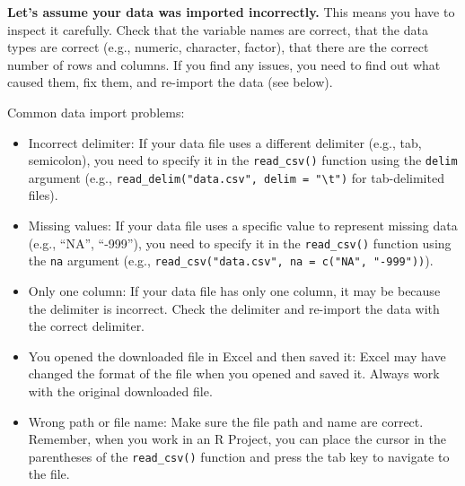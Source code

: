 \documentclass[
  letterpaper,
  8pt,
  a4paper]{book}
\providecommand{\tightlist}{%
  \setlength{\itemsep}{0pt}\setlength{\parskip}{0pt}}
\begin{document}
\begin{tcolorbox}[enhanced jigsaw, arc=.35mm, bottomrule=.15mm, bottomtitle=1mm, breakable, colback=white, colbacktitle=quarto-callout-important-color!10!white, colframe=quarto-callout-important-color-frame, coltitle=black, left=2mm, leftrule=.75mm, opacityback=0, opacitybacktitle=0.6, rightrule=.15mm, title=\textcolor{quarto-callout-important-color}{\faExclamation}\hspace{0.5em}{Important}, titlerule=0mm, toprule=.15mm, toptitle=1mm]

\textbf{Let's assume your data was imported incorrectly.} This means you
have to inspect it carefully. Check that the variable names are correct,
that the data types are correct (e.g., numeric, character, factor), that
there are the correct number of rows and columns. If you find any
issues, you need to find out what caused them, fix them, and re-import
the data (see below).

\end{tcolorbox}

Common data import problems:

\begin{itemize}
\tightlist
\item
  Incorrect delimiter: If your data file uses a different delimiter
  (e.g., tab, semicolon), you need to specify it in the
  \texttt{read\_csv()} function using the \texttt{delim} argument (e.g.,
  \texttt{read\_delim("data.csv",\ delim\ =\ "\textbackslash{}t")} for
  tab-delimited files).
\item
  Missing values: If your data file uses a specific value to represent
  missing data (e.g., ``NA'', ``-999''), you need to specify it in the
  \texttt{read\_csv()} function using the \texttt{na} argument (e.g.,
  \texttt{read\_csv("data.csv",\ na\ =\ c("NA",\ "-999"))}).
\item
  Only one column: If your data file has only one column, it may be
  because the delimiter is incorrect. Check the delimiter and re-import
  the data with the correct delimiter.
\item
  You opened the downloaded file in Excel and then saved it: Excel may
  have changed the format of the file when you opened and saved it.
  Always work with the original downloaded file.
\item
  Wrong path or file name: Make sure the file path and name are correct.
  Remember, when you work in an R Project, you can place the cursor in
  the parentheses of the \texttt{read\_csv()} function and press the tab
  key to navigate to the file.
\end{itemize}
\end{document}
